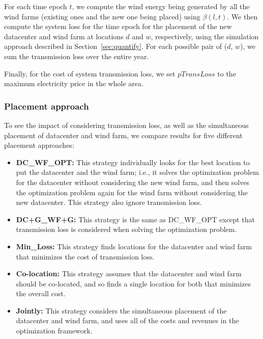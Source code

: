 For each time epoch $t$, we compute the wind energy being generated by all the wind farms (existing ones and the new one being placed) using $\beta(l,t)$.  We then compute the system loss for the time epoch for the placement of the new datacenter and wind farm at locations $d$ and $w$, respectively, using the simulation approach described in Section~\ref{sec:quantify}.  For each possible pair of ($d$, $w$), we sum the transmission loss over the entire year.

Finally, for the cost of system transmission loss, we set $pTransLoss$ to the maximum electricity price in the whole area.  

\subsubsection{Placement approach}

To see the impact of considering transmission loss, as well as the simultaneous placement of datacenter and wind farm, we compare results for five different placement approaches:

\begin{itemize}

\item \textbf{DC\_WF\_OPT:} This strategy individually looks for the best location to put the datacenter and the wind farm; i.e., it solves the optimization problem for the datacenter without considering the new wind farm, and then solves the optimization problem again for the wind farm without considering the new datacenter.  This strategy also ignore transmission loss.

\item \textbf{DC+G\_WF+G:} This strategy is the same as DC\_WF\_OPT except that transmission loss is considered when solving the optimization problem.

\item \textbf{Min\_Loss:} This strategy finds locations for the datacenter and wind farm that minimizes the cost of transmission loss.

\item \textbf{Co-location:} This strategy assumes that the datacenter and wind farm
should be co-located, and so finds a single location for both that minimizes the overall cost.

\item \textbf{Jointly:} This strategy considers the simultaneous placement of the datacenter and wind farm, and uses all of the costs and revenues in the optimization framework.

\end{itemize}

